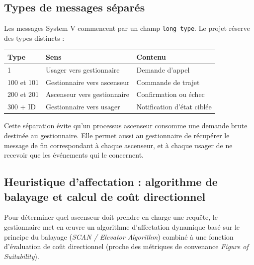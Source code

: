 \documentclass[11pt,a4paper]{article}
\begin{document}
\subsection{Types de messages séparés}

Les messages System V commencent par un champ \texttt{long type}. Le projet réserve des types distincts :
\begin{center}
\begin{tabular}{lll}
\toprule
\textbf{Type} & \textbf{Sens} & \textbf{Contenu}\\
\midrule
1 & Usager vers gestionnaire & Demande d'appel\\
100 et 101 & Gestionnaire vers ascenseur & Commande de trajet\\
200 et 201 & Ascenseur vers gestionnaire & Confirmation ou échec\\
300 + ID & Gestionnaire vers usager & Notification d'état ciblée\\
\bottomrule
\end{tabular}
\end{center}
Cette séparation évite qu'un processus ascenseur consomme une demande brute destinée au gestionnaire. Elle permet aussi au gestionnaire de récupérer le message de fin correspondant à chaque ascenseur, et à chaque usager de ne recevoir que les événements qui le concernent.

\subsection{Heuristique d'affectation : algorithme de balayage et calcul de coût directionnel}

Pour déterminer quel ascenseur doit prendre en charge une requête, le gestionnaire met en œuvre un algorithme d'affectation dynamique basé sur le principe du balayage (\textit{SCAN / Elevator Algorithm}) combiné à une fonction d'évaluation de coût directionnel (proche des métriques de convenance \textit{Figure of Suitability}).
\end{document}
